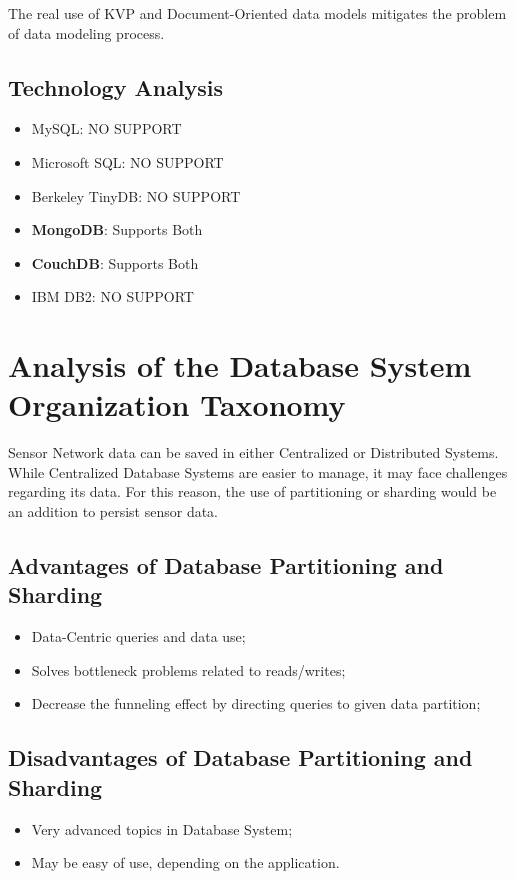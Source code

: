 The real use of KVP and Document-Oriented data models mitigates the problem of
data modeling process.

\subsection{Technology Analysis}

\begin{itemize}
  \item MySQL: NO SUPPORT
  \item Microsoft SQL: NO SUPPORT
  \item Berkeley TinyDB: NO SUPPORT
  \item \textbf{MongoDB}: Supports Both
  \item \textbf{CouchDB}: Supports Both
  \item IBM DB2: NO SUPPORT
\end{itemize}

\section{Analysis of the Database System Organization Taxonomy}

Sensor Network data can be saved in either Centralized or Distributed Systems.
While Centralized Database Systems are easier to manage, it may face challenges
regarding its data. For this reason, the use of partitioning or sharding would
be an addition to persist sensor data.

\subsection{Advantages of Database Partitioning and Sharding}

\begin{itemize}
  \item Data-Centric queries and data use;
  \item Solves bottleneck problems related to reads/writes;
  \item Decrease the funneling effect by directing queries to given data
  partition;
\end{itemize}

\subsection{Disadvantages of Database Partitioning and Sharding}

\begin{itemize}
  \item Very advanced topics in Database System;
  \item May be easy of use, depending on the application.
\end{itemize}

